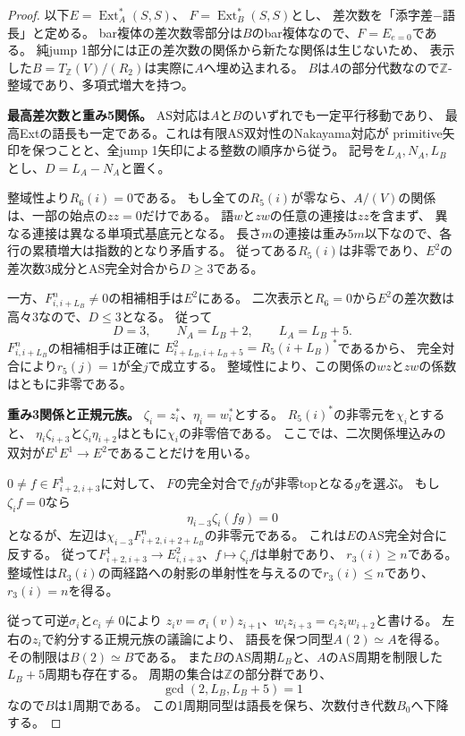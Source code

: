 \documentclass[11pt,a4paper]{ltjsarticle}
\theoremstyle{definition}
\begin{document}
\begin{proof}
以下$E=\operatorname{Ext}_A^*(S,S)$、
$F=\operatorname{Ext}_B^*(S,S)$とし、
差次数を「添字差$-$語長」と定める。
bar複体の差次数零部分は$B$のbar複体なので、$F=E_{e=0}$である。
純jump 1部分には正の差次数の関係から新たな関係は生じないため、
表示した$B=T_{\mathbb Z}(V)/(R_2)$は実際に$A$へ埋め込まれる。
$B$は$A$の部分代数なので$\mathbb Z$-整域であり、多項式増大を持つ。

\par\smallskip\noindent\textbf{最高差次数と重み5関係。}\quad
AS対応は$A$と$B$のいずれでも一定平行移動であり、
最高Extの語長も一定である。これは有限AS双対性のNakayama対応が
primitive矢印を保つことと、全jump 1矢印による整数の順序から従う。
記号を$L_A,N_A,L_B$とし、$D=L_A-N_A$と置く。

整域性より$R_6(i)=0$である。
もし全ての$R_5(i)$が零なら、$A/(V)$の関係は、一部の始点の$zz=0$だけである。
語$w$と$zw$の任意の連接は$zz$を含まず、
異なる連接は異なる単項式基底元となる。
長さ$m$の連接は重み$5m$以下なので、各行の累積増大は指数的となり矛盾する。
従ってある$R_5(i)$は非零であり、$E^2$の差次数3成分とAS完全対合から$D\ge3$である。

一方、$F^n_{i,i+L_B}\ne0$の相補相手は$E^2$にある。
二次表示と$R_6=0$から$E^2$の差次数は高々3なので、$D\le3$となる。
従って
\[
D=3,\qquad N_A=L_B+2,\qquad L_A=L_B+5.
\]
$F^n_{i,i+L_B}$の相補相手は正確に
$E^2_{i+L_B,i+L_B+5}=R_5(i+L_B)^*$であるから、
完全対合により$r_5(j)=1$が全$j$で成立する。
整域性により、この関係の$wz$と$zw$の係数はともに非零である。

\par\smallskip\noindent\textbf{重み3関係と正規元族。}\quad
$\zeta_i=z_i^*$、$\eta_i=w_i^*$とする。
$R_5(i)^*$の非零元を$\chi_i$とすると、
$\eta_i\zeta_{i+3}$と$\zeta_i\eta_{i+2}$はともに$\chi_i$の非零倍である。
ここでは、二次関係埋込みの双対が$E^1E^1\to E^2$であることだけを用いる。

$0\ne f\in F^1_{i+2,i+3}$に対して、
$F$の完全対合で$fg$が非零topとなる$g$を選ぶ。
もし$\zeta_i f=0$なら
\[
\eta_{i-3}\zeta_i(fg)=0
\]
となるが、左辺は$\chi_{i-3}F^n_{i+2,i+2+L_B}$の非零元である。
これは$E$のAS完全対合に反する。
従って$F^1_{i+2,i+3}\to E^2_{i,i+3}$、$f\mapsto\zeta_i f$は単射であり、
$r_3(i)\ge n$である。
整域性は$R_3(i)$の両経路への射影の単射性を与えるので$r_3(i)\le n$であり、
$r_3(i)=n$を得る。

従って可逆$\sigma_i$と$c_i\ne0$により
$z_i v=\sigma_i(v)z_{i+1}$、$w_i z_{i+3}=c_i z_i w_{i+2}$と書ける。
左右の$z_i$で約分する正規元族の議論により、
語長を保つ同型$A(2)\simeq A$を得る。その制限は$B(2)\simeq B$である。
また$B$のAS周期$L_B$と、$A$のAS周期を制限した$L_B+5$周期も存在する。
周期の集合は$\mathbb Z$の部分群であり、
\[
\gcd(2,L_B,L_B+5)=1
\]
なので$B$は1周期である。
この1周期同型は語長を保ち、次数付き代数$B_0$へ下降する。


\end{proof}
\end{document}
